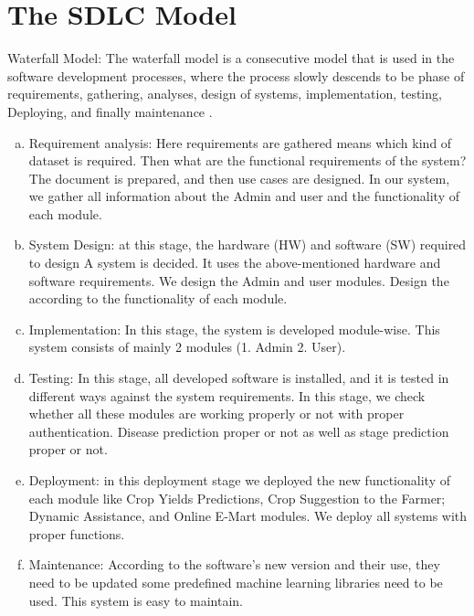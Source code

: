 \section{The SDLC Model}
Waterfall Model: The waterfall model is a consecutive model that is used in the software development processes, where the process slowly descends to be phase of requirements, gathering, analyses, design of systems, implementation, testing, Deploying, and finally maintenance \cite{chen791-53}.

\begin{enumerate}[a)]
    \item Requirement analysis: Here requirements are gathered means which kind of dataset is required. Then what are the functional requirements of the system? The document is prepared, and then use cases are designed. In our system, we gather all information about the Admin and user and the functionality of each module.
    \item System Design: at this stage, the hardware (HW) and software (SW) required to design A system is decided. It uses the above-mentioned hardware and software requirements. We design the Admin and user modules. Design the according to the functionality of each module.
    \item Implementation: In this stage, the system is developed module-wise. This system consists of mainly 2 modules (1. Admin 2. User).
    \item Testing: In this stage, all developed software is installed, and it is tested in different ways against the system requirements. In this stage, we check whether all these modules are working properly or not with proper authentication. Disease prediction proper or not as well as stage prediction proper or not.
    \item Deployment: in this deployment stage we deployed the new functionality of each module like Crop Yields Predictions, Crop Suggestion to the Farmer; Dynamic Assistance, and Online E-Mart modules. We deploy all systems with proper functions.
    \item Maintenance: According to the software’s new version and their use, they need to be updated some predefined machine learning libraries need to be used. This system is easy to maintain.
\end{enumerate}
